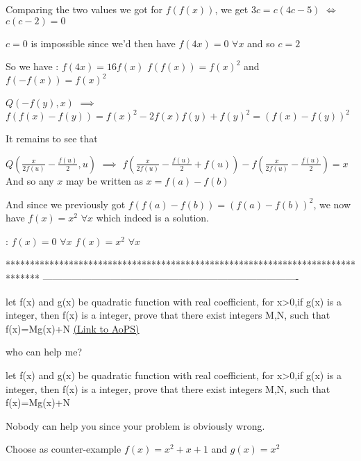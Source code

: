 \begin{solution}
Comparing the two values we got for $f(f(x))$, we get $3c=c(4c-5)$ $\iff$ $c(c-2)=0$

$c=0$ is impossible since we'd then have $f(4x)=0$ $\forall x$ and so $c=2$

So we have :
$f(4x)=16f(x)$
$f(f(x))=f(x)^2$ and $f(-f(x))=f(x)^2$

$Q(-f(y),x)$ $\implies$ $f(f(x)-f(y))=f(x)^2-2f(x)f(y)+f(y)^2=(f(x)-f(y))^2$

It remains to see that 

$Q(\frac x{2f(u)}-\frac{f(u)}2,u)$ $\implies$ $f(\frac x{2f(u)}-\frac{f(u)}2+f(u))-f(\frac x{2f(u)}-\frac{f(u)}2)=x$
And so any $x$ may be written as $x=f(a)-f(b)$

And since we previously got $f(f(a)-f(b))=(f(a)-f(b))^2$, we now have $f(x)=x^2$ $\forall x$ which indeed is a solution.

 :
$f(x)=0$ $\forall x$
$f(x)=x^2$ $\forall x$
\end{solution}
*******************************************************************************
-------------------------------------------------------------------------------

\begin{problem}
	let f(x) and g(x) be quadratic function with real coefficient, for x>0,if g(x) is a integer, then f(x) is a integer, prove that there exist integers M,N, such that f(x)=Mg(x)+N
	\flushright \href{https://artofproblemsolving.com/community/c6h472459}{(Link to AoPS)}
\end{problem}



\begin{solution}
	who can help me?
\end{solution}



\begin{solution}
	\begin{tcolorbox}let f(x) and g(x) be quadratic function with real coefficient, for x>0,if g(x) is a integer, then f(x) is a integer, prove that there exist integers M,N, such that f(x)=Mg(x)+N\end{tcolorbox}
Nobody can help you since your problem is obviously wrong.

Choose as counter-example $f(x)=x^2+x+1$ and $g(x)=x^2$
\end{solution}



